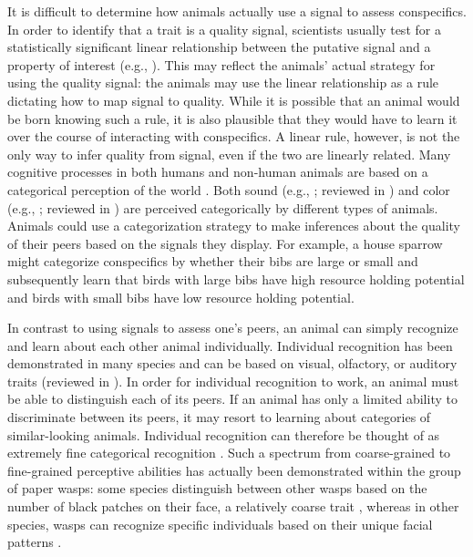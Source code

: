 It is difficult to determine how animals actually use a signal to assess conspecifics. In order to identify that a trait is a quality signal, scientists usually test for a statistically significant linear relationship between the putative signal and a property of interest (e.g., \citep{Rohwer:1981vn,Rohwer:1982fk,Ripoll:2004vn,Tibbetts:2004kx}). This may reflect the animals' actual strategy for using the quality signal: the animals may use the linear relationship as a rule dictating how to map signal to quality. While it is possible that an animal would be born knowing such a rule, it is also plausible that they would have to learn it over the course of interacting with conspecifics. A linear rule, however, is not the only way to infer quality from signal, even if the two are linearly related. Many cognitive processes in both humans and non-human animals are based on a categorical perception of the world \citep{Harnad:1990ux}. Both sound (e.g., \citep{Wyttenbach:1996wj,Nelson:1989rt}; reviewed in \citep{Bornstein:1987ec,Ehret:1987jh}) and color (e.g., \citep{Lim:2016ye}; reviewed in \citep{Bornstein:1987ec}) are perceived categorically by different types of animals. Animals could use a categorization strategy to make inferences about the quality of their peers based on the signals they display. For example, a house sparrow might categorize conspecifics by whether their bibs are large or small and subsequently learn that birds with large bibs have high resource holding potential and birds with small bibs have low resource holding potential.
 
In contrast to using signals to assess one's peers, an animal can simply recognize and learn about each other animal individually. Individual recognition has been demonstrated in many species and can be based on visual, olfactory, or auditory traits (reviewed in \citep{Tibbetts2007IndividualDifferent}). In order for individual recognition to work, an animal must be able to distinguish each of its peers. If an animal has only a limited ability to discriminate between its peers, it may resort to learning about categories of similar-looking animals. Individual recognition can therefore be thought of as extremely fine categorical recognition \citep{Barnard:1979fk}. Such a spectrum from coarse-grained to fine-grained perceptive abilities has actually been demonstrated within the group of paper wasps: some species distinguish between other wasps based on the number of black patches on their face, a relatively coarse trait \citep{Tibbetts:2004kx}, whereas in other species, wasps can recognize specific individuals based on their unique facial patterns \citep{Tibbetts:2002ys}. 

